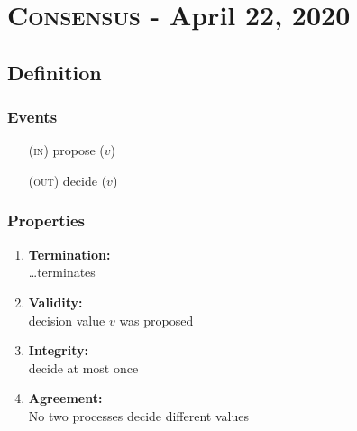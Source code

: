 \documentclass{article}
\begin{document}
	\newpage
	
	\section{\textsc{Consensus} - April 22, 2020}
	\begin{adjustwidth}{2em}{2em}
		\subsection{Definition}
		\begin{adjustwidth}{2em}{2em}
			\subsubsection{Events}
			\begin{adjustwidth}{2em}{}
				\begin{enumerate}
					\item[(\textsc{in})] propose ($v$)
					\item[(\textsc{out})] decide ($v$)
				\end{enumerate}
			\end{adjustwidth}
			\subsubsection{Properties}
			\begin{adjustwidth}{2em}{}
				\begin{enumerate}[-]
					\item \textbf{Termination:} \\
					\ldots terminates
					\item \textbf{Validity:} \\
					decision value $v$ was proposed
					\item \textbf{Integrity:} \\
					decide at most once
					\item \textbf{Agreement:} \\
					No two processes decide different values
				\end{enumerate}
			\end{adjustwidth}
		\end{adjustwidth}

\end{adjustwidth}
\end{document}
